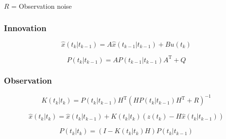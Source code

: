\documentclass[a4paper]{report}
\numberwithin{equation}{chapter}
\begin{document}
$R$ = Observation noise

\subsubsection[Innovation]{Innovation}

\begin{equation}
\hat{x} \left( t_k|t_{k-1} \right) = A\hat{x} \left( t_{k-1}|t_{k-1} \right) + Bu \left( t_k \right)
\end{equation}

\begin{equation}
P \left( t_k|t_{k-1} \right) = A P \left( t_{k-1}|t_{k-1} \right) A^{\mathrm{T}} + Q
\end{equation}

\subsubsection[Observation]{Observation}

\begin{equation}
K \left( t_k|t_k \right) = P \left( t_k|t_{k-1} \right) H^{\mathrm{T}} \left( HP \left( t_k|t_{k-1} \right) H^{\mathrm{T}} + R \right) ^{-1}
\end{equation}

\begin{equation}
\hat{x} \left( t_k|t_k \right) = \hat{x} \left( t_k|t_{k-1} \right) + K \left( t_k|t_k \right) \left( z \left(t_k \right) - H\hat{x} \left( t_k|t_{k-1} \right) \right)
\end{equation}

\begin{equation}
P \left( t_k|t_k \right) = \left( I - K \left( t_k|t_k \right)H \right) P \left( t_k|t_{k-1} \right)
\end{equation}
\end{document}
